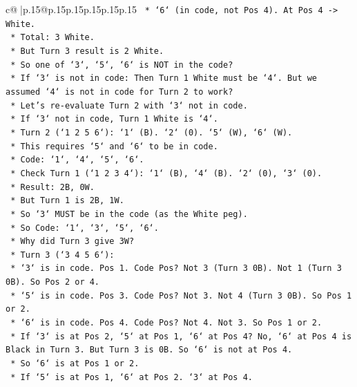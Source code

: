 \documentclass{article}
\begin{document}
{\begin{supertabular}{c@{$\;$}|p{.15\linewidth}@{}p{.15\linewidth}p{.15\linewidth}p{.15\linewidth}p{.15\linewidth}p{.15\linewidth}}
{{{\texttt{            *   `6` (in code, not Pos 4). At Pos 4 {-}> White.} \\
\texttt{            *   Total: 3 White.} \\
\texttt{            *   But Turn 3 result is 2 White.} \\
\texttt{            *   So one of `3`, `5`, `6` is NOT in the code?} \\
\texttt{            *   If `3` is not in code: Then Turn 1 White must be `4`. But we assumed `4` is not in code for Turn 2 to work?} \\
\texttt{            *   Let's re{-}evaluate Turn 2 with `3` not in code.} \\
\texttt{            *   If `3` not in code, Turn 1 White is `4`.} \\
\texttt{            *   Turn 2 (`1 2 5 6`): `1` (B). `2` (0). `5` (W), `6` (W).} \\
\texttt{            *   This requires `5` and `6` to be in code.} \\
\texttt{            *   Code: `1`, `4`, `5`, `6`.} \\
\texttt{            *   Check Turn 1 (`1 2 3 4`): `1` (B), `4` (B). `2` (0), `3` (0).} \\
\texttt{            *   Result: 2B, 0W.} \\
\texttt{            *   But Turn 1 is 2B, 1W.} \\
\texttt{            *   So `3` MUST be in the code (as the White peg).} \\
\texttt{            *   So Code: `1`, `3`, `5`, `6`.} \\
\texttt{            *   Why did Turn 3 give 3W?} \\
\texttt{            *   Turn 3 (`3 4 5 6`):} \\
\texttt{                *   `3` is in code. Pos 1. Code Pos? Not 3 (Turn 3 0B). Not 1 (Turn 3 0B). So Pos 2 or 4.} \\
\texttt{                *   `5` is in code. Pos 3. Code Pos? Not 3. Not 4 (Turn 3 0B). So Pos 1 or 2.} \\
\texttt{                *   `6` is in code. Pos 4. Code Pos? Not 4. Not 3. So Pos 1 or 2.} \\
\texttt{                *   If `3` is at Pos 2, `5` at Pos 1, `6` at Pos 4? No, `6` at Pos 4 is Black in Turn 3. But Turn 3 is 0B. So `6` is not at Pos 4.} \\
\texttt{                *   So `6` is at Pos 1 or 2.} \\
\texttt{                *   If `5` is at Pos 1, `6` at Pos 2. `3` at Pos 4.} \\
}}}
\end{supertabular}}
\end{document}
